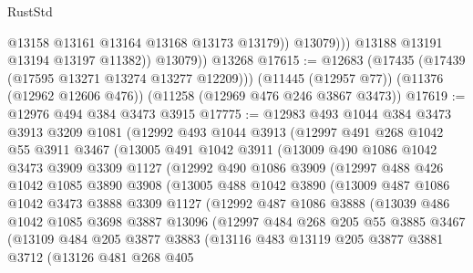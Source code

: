 \begin{lexlean}{RustStd}
\begin{coremodule}
{\begin{coremodule}
{{{{{{{{{{{{{{{{{{{{{{{{{{{{{{{{{{{{{{{{{{{{{{{{{{{{{{{{{{{{{{{{{{{{{{{{{{{{{{{{{{{{{                      @13158
                      @13161
                      @13164
                      @13168
                      @13173
                      @13179))
                  @13079)))
            @13188
            @13191
            @13194
            @13197
            @11382))
        @13079))
    @13268
@17615 := @12683
    (@17435 (@17439 (@17595 @13271 @13274 @13277 @12209)))
    (@11445 (@12957 @77))
    (@11376 (@12962 @12606 @476))
    (@11258 (@12969 @476 @246 @3867 @3473))
@17619 := @12976 @494 @384 @3473 @3915
@17775 := @12983
    @493
    @1044
    @384
    @3473
    @3913
    @3209
    @1081
    (@12992
      @493
      @1044
      @3913
      (@12997
        @491
        @268
        @1042
        @55
        @3911
        @3467
        (@13005
          @491
          @1042
          @3911
          (@13009
            @490
            @1086
            @1042
            @3473
            @3909
            @3309
            @1127
            (@12992
              @490
              @1086
              @3909
              (@12997
                @488
                @426
                @1042
                @1085
                @3890
                @3908
                (@13005
                  @488
                  @1042
                  @3890
                  (@13009
                    @487
                    @1086
                    @1042
                    @3473
                    @3888
                    @3309
                    @1127
                    (@12992
                      @487
                      @1086
                      @3888
                      (@13039
                        @486
                        @1042
                        @1085
                        @3698
                        @3887
                        @13096
                        (@12997
                          @484
                          @268
                          @205
                          @55
                          @3885
                          @3467
                          (@13109
                            @484
                            @205
                            @3877
                            @3883
                            (@13116
                              @483
                              @13119
                              @205
                              @3877
                              @3881
                              @3712
                              (@13126
                                @481
                                @268
                                @405
}}}}}}}}}}}}}}}}}}}}}}}}}}}}}}}}}}}}}}}}}}}}}}}}}}}}}}}}}}}}}}}}}}}}}}}}}}}}}}}}}}}}}
\end{coremodule}}
\end{coremodule}
\end{lexlean}
